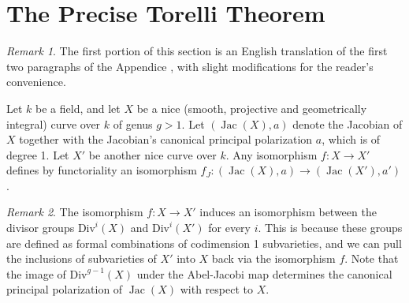 \documentclass[12pt,reqno]{amsart}
\DeclareMathOperator{\Jac}{Jac}
\newcommand{\R}{\mathbb{R}}
\theoremstyle{definition}
\theoremstyle{remark}
\newtheorem*{remark}{Remark}
\newcommand{\ti}{\todo[inline]}
\begin{document}





\section{The Precise Torelli Theorem}
\label{sec:torelli}


\begin{remark} The first portion of this section is an English translation of the first two paragraphs of the Appendice \cite{Torelli}, with slight modifications for the reader's convenience.\end{remark}

Let $k$ be a field, and let $X$ be a nice (smooth, projective and geometrically integral) curve over $k$ of genus $g > 1$.  Let $(\operatorname{Jac}(X),a)$ denote the Jacobian of $X$ together with the Jacobian's canonical principal polarization $a$, which is of degree 1.  Let $X'$ be another nice curve over $k.$ Any isomorphism $f: X \to X'$ defines by functoriality an isomorphism $f_J: (\Jac(X), a) \to (\Jac(X'), a')$. 

\begin{remark} The isomorphism $f: X \to X'$ induces an isomorphism between the divisor groups $\text{Div}^i(X)$ and $\text{Div}^i(X')$ for every $i$. This is because these groups are defined as formal combinations of codimension 1 subvarieties, and we can pull the inclusions of subvarieties of $X'$ into $X$ back via the isomorphism $f$. Note that the image of $\text{Div}^{g-1}(X)$ under the Abel-Jacobi map determines the canonical principal polarization of $\Jac(X)$ with respect to $X$. \end{remark}
\end{document}
